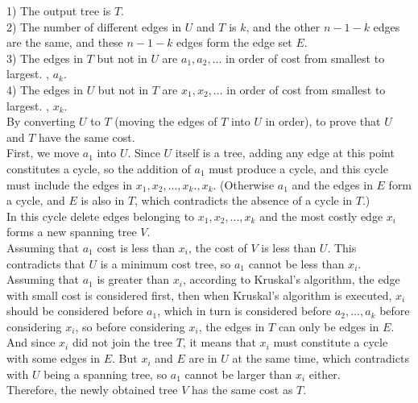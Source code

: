 \documentclass{article}
\begin{document}
1) The output tree is $T$.\\

2) The number of different edges in $U$ and $T$ is $k$, and the other $n-1-k$ edges are the same, and these $n-1-k$ edges form the edge set $E$.\\

3) The edges in $T$ but not in $U$ are $a_1, a_2, ...$ in order of cost from smallest to largest. , $a_k$.\\

4) The edges in $U$ but not in $T$ are $x_1, x_2, ...$ in order of cost from smallest to largest. , $x_k$.\\

By converting $U$ to $T$ (moving the edges of $T$ into $U$ in order), to prove that $U$ and $T$ have the same cost.\\

First, we move $a_1$ into $U$. Since $U$ itself is a tree, adding any edge at this point constitutes a cycle, so the addition of $a_1$ must produce a cycle, and this cycle must include the edges in $x_1, x_2, ... , x_k. , x_k.$ (Otherwise $a_1$ and the edges in $E$ form a cycle, and $E$ is also in $T$, which contradicts the absence of a cycle in $T$.)\\

In this cycle delete edges belonging to $x_1, x_2, ... , x_k$ and the most costly edge $x_i$ forms a new spanning tree $V$.\\

Assuming that $a_1$ cost is less than $x_i$, the cost of $V$ is less than $U$. This contradicts that $U$ is a minimum cost tree, so $a_1$ cannot be less than $x_i$.\\
Assuming that $a_1$ is greater than $x_i$, according to Kruskal's algorithm, the edge with small cost is considered first, then when Kruskal's algorithm is executed, $x_i$ should be considered before $a_1$, which in turn is considered before $a_2, ... , a_k$ before considering $x_i$, so before considering $x_i$, the edges in $T$ can only be edges in $E$. And since $x_i$ did not join the tree $T$, it means that $x_i$ must constitute a cycle with some edges in $E$. But $x_i$ and $E$ are in $U$ at the same time, which contradicts with $U$ being a spanning tree, so $a_1$ cannot be larger than $x_i$ either.\\

Therefore, the newly obtained tree $V$ has the same cost as $T$.\\
\end{document}
